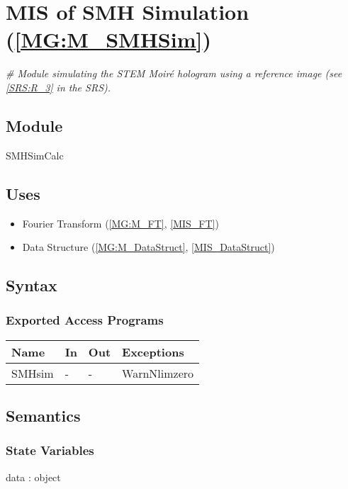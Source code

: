 \documentclass[12pt, titlepage]{article}
\begin{document}
\section{MIS of SMH Simulation (\texorpdfstring{\cref{MG:M_SMHSim}}))} 
\label{MIS_SMHSim}

\noindent\textit{{\#} Module simulating the STEM Moir{\'e} hologram using a 
reference image (see \cref{SRS:R_3} in the SRS).}

\subsection{Module}
SMHSimCalc
\subsection{Uses}
\begin{itemize}
\item Fourier Transform (\cref{MG:M_FT}, \cref{MIS_FT})
\item Data Structure (\cref{MG:M_DataStruct}, \cref{MIS_DataStruct})
\end{itemize}

\subsection{Syntax}

\subsubsection{Exported Access Programs}

\begin{center}
\begin{tabular}{p{3cm} p{3cm} p{3cm} p{4cm}}
\hline
\textbf{Name} & \textbf{In} & \textbf{Out} & \textbf{Exceptions} \\
\hline
SMHsim & - & - & WarnNlimzero\\
\hline
\end{tabular}
\end{center}

\subsection{Semantics}

\subsubsection{State Variables}

data : object
\end{document}
